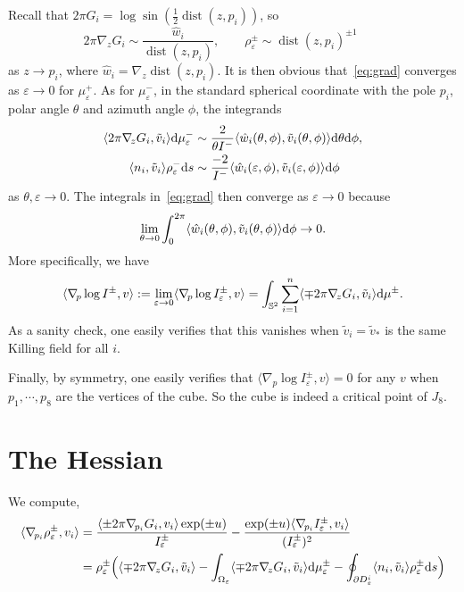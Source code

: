 \documentclass[a4paper]{amsart}
\newcommand{\uS}{\mathbb{S}}
\newcommand{\dist}{\operatorname{dist}}
\newcommand{\dd}{{\rm d}}
\theoremstyle{plain} %
\theoremstyle{definition} %
\theoremstyle{remark}
\begin{document}
\medskip

Recall that $2\pi G_i = \log \sin (\frac{1}{2} \dist(z, p_i))$, so
\[
	2\pi \nabla_{\! z} G_i \sim \frac{\hat w_i}{\dist(z, p_i)}, \qquad
	\rho^\pm_\varepsilon \sim \dist(z, p_i)^{\pm 1} \qquad
\]
as $z \to p_i$, where $\hat w_i = \nabla_z \dist(z, p_i)$.  It is then obvious
that~\eqref{eq:grad} converges as $\varepsilon \to 0$ for $\mu^+_\varepsilon$.
As for $\mu^-_\varepsilon$, in the standard spherical coordinate with the pole
$p_i$, polar angle $\theta$ and azimuth angle $\phi$, the integrands
\begin{align*}
	\langle 2\pi \nabla_{\! z} G_i, \tilde v_i \rangle \dd\mu_\varepsilon^-
	&\sim \frac{2}{\theta I^-} \langle \hat w_i(\theta, \phi), \tilde v_i(\theta, \phi) \rangle \dd \theta \dd \phi,\\
	\langle n_i, \tilde v_i \rangle \rho_\varepsilon^- \dd s
	&\sim \frac{-2}{I^-} \langle \hat w_i(\varepsilon, \phi), \tilde v_i(\varepsilon, \phi) \rangle \dd \phi
\end{align*}
as $\theta, \varepsilon \to 0$.  The integrals in~\eqref{eq:grad} then converge
as $\varepsilon \to 0$ because
\[
	\lim_{\theta \to 0} \int_0^{2\pi} \langle \hat w_i(\theta, \phi), \tilde v_i(\theta, \phi) \rangle \dd \phi \to 0.
\]
More specifically, we have
\[
	\langle \nabla_{\! p} \log I^\pm, v\rangle :=
	\lim_{\varepsilon\to 0}\langle \nabla_{\! p} \log I^\pm_\varepsilon, v\rangle 
	= \int_{\uS^2} \sum_{i=1}^n \langle \mp 2\pi \nabla_{\! z} G_i, \tilde v_i \rangle \dd\mu^\pm.
\]
As a sanity check, one easily verifies that this vanishes when $\tilde v_i =
\tilde v_*$ is the same Killing field for all $i$.

\medskip

Finally, by symmetry, one easily verifies that $\langle \nabla_{\! p} \log
I^\pm_\varepsilon, v\rangle = 0$ for any $v$ when $p_1,\cdots,p_8$ are the
vertices of the cube. So the cube is indeed a critical point of $J_8$.

\section{The Hessian}
\label{app:hessian}

We compute,
\begin{align*}
	\langle \nabla_{\! p_i} \rho^\pm_\varepsilon, v_i\rangle
	&=
	\frac{\langle \pm 2\pi \nabla_{\! p_i} G_i, v_i \rangle \exp(\pm u)}{I_\varepsilon^\pm}
	-
	\frac{\exp(\pm u) \langle \nabla_{\! p_i} I_\varepsilon^\pm, v_i\rangle}{(I_\varepsilon^\pm)^2}
	\\
	&= \rho_\varepsilon^\pm \Big(
		\langle \mp 2\pi \nabla_{\! z} G_i, \tilde v_i \rangle
		- \int_{\Omega_\varepsilon} \langle \mp 2\pi \nabla_{\! z} G_i, \tilde v_i \rangle \dd\mu_\varepsilon^\pm
		- \oint_{\partial D^i_\varepsilon} \langle n_i, \tilde v_i \rangle \rho_\varepsilon^\pm \dd s
	\Big)
\end{align*}
\end{document}
